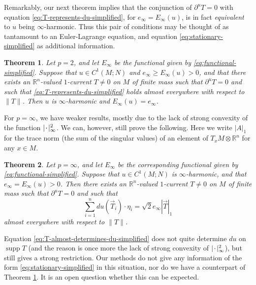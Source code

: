 \documentclass[10pt,a4paper]{amsart}
\newcommand{\R}{\mathbb{R}}
\DeclareMathOperator{\supp}{supp}
\newcommand{\blank}{{\mkern 2mu\cdot\mkern 2mu}}
\newtheorem{theorem}{Theorem}
\begin{document}
Remarkably, our next theorem implies that the conjunction of $\partial^u T = 0$
with equation \eqref{eq:T-represents-du-simplified}, for $e_\infty = E_\infty(u)$,
is in fact \emph{equivalent} to $u$ being
$\infty$-harmonic. Thus this pair of conditions may be thought of as
tantamount to an Euler-Lagrange equation, and equation \eqref{eq:stationary-simplified} as additional information.

\begin{theorem} \label{thm:equivalence-simplified}
Let $p = 2$, and let $E_\infty$ be the functional given by \eqref{eq:functional-simplified}. Suppose that
$u \in C^1(M; N)$ and $e_\infty \ge E_\infty(u) > 0$, and that
there exists an $\R^n$-valued $1$-current $T \neq 0$ on $M$ of finite mass such that
$\partial^u T = 0$ and such that \eqref{eq:T-represents-du-simplified} holds almost everywhere with respect to $\|T\|$.
Then $u$ is $\infty$-harmonic and $E_\infty(u) = e_\infty$.
\end{theorem}

For $p = \infty$, we have weaker results, mostly due to the lack of strong convexity of the function $|\blank|_\infty^2$. We can, however, still prove the following. Here we write $|A|_1$ for the trace norm (the sum of the singular values) of an element of $T_x M \otimes \R^n$ for any $x \in M$.

\begin{theorem} \label{thm:weak-geodesic-simplified}
Let $p = \infty$, and let $E_\infty$ be the corresponding functional given by \eqref{eq:functional-simplified}. Suppose that $u \in C^1(M; N)$ is $\infty$-harmonic, and that $e_\infty = E_\infty(u) > 0$.
Then there exists an $\R^n$-valued $1$-current $T \neq 0$ on $M$ of finite mass such that
$\partial^u T = 0$ and such that
\begin{equation} \label{eq:T-almost-determines-du-simplified}
\sum_{i = 1}^n du(\vec{T}_i) \cdot \eta_i = \sqrt{2}e_\infty |\vec{T}|_1
\end{equation}
almost everywhere with respect to $\|T\|$.
\end{theorem}

Equation \eqref{eq:T-almost-determines-du-simplified} does not quite determine
$du$ on $\supp T$ (and the reason is once more the lack of strong convexity
of $|\blank|_\infty^2$), but still gives a strong restriction. Our methods
do not give any information of the form \eqref{eq:stationary-simplified} in this situation, nor do we have a counterpart of Theorem \ref{thm:equivalence-simplified}.
It is an open question whether this can be expected.
\end{document}
